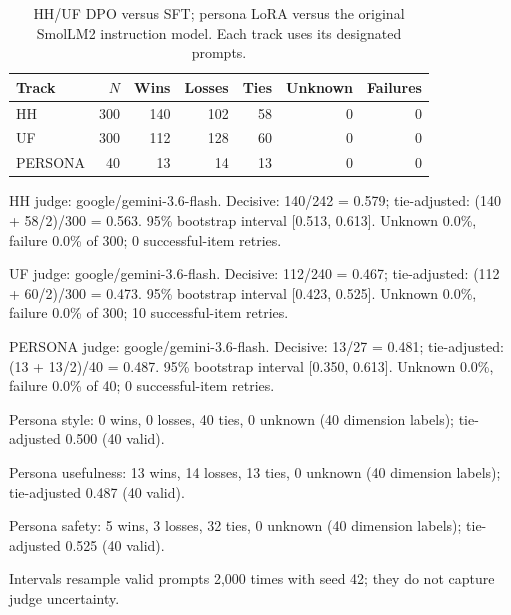 \begin{table}[H]\centering\small\begin{tabular}{lrrrrrr}\toprule Track & $N$ & Wins & Losses & Ties & Unknown & Failures\\\midrule
HH & 300 & 140 & 102 & 58 & 0 & 0\\
UF & 300 & 112 & 128 & 60 & 0 & 0\\
PERSONA & 40 & 13 & 14 & 13 & 0 & 0\\
\bottomrule\end{tabular}\caption{HH/UF DPO versus SFT; persona LoRA versus the original SmolLM2 instruction model. Each track uses its designated prompts.}\end{table}

HH judge: google/gemini-3.6-flash. Decisive: 140/242 = 0.579; tie-adjusted: (140 + 58/2)/300 = 0.563. 95\% bootstrap interval [0.513, 0.613]. Unknown 0.0\%, failure 0.0\% of 300; 0 successful-item retries.

UF judge: google/gemini-3.6-flash. Decisive: 112/240 = 0.467; tie-adjusted: (112 + 60/2)/300 = 0.473. 95\% bootstrap interval [0.423, 0.525]. Unknown 0.0\%, failure 0.0\% of 300; 10 successful-item retries.

PERSONA judge: google/gemini-3.6-flash. Decisive: 13/27 = 0.481; tie-adjusted: (13 + 13/2)/40 = 0.487. 95\% bootstrap interval [0.350, 0.613]. Unknown 0.0\%, failure 0.0\% of 40; 0 successful-item retries.

Persona style: 0 wins, 0 losses, 40 ties, 0 unknown (40 dimension labels); tie-adjusted 0.500 (40 valid).

Persona usefulness: 13 wins, 14 losses, 13 ties, 0 unknown (40 dimension labels); tie-adjusted 0.487 (40 valid).

Persona safety: 5 wins, 3 losses, 32 ties, 0 unknown (40 dimension labels); tie-adjusted 0.525 (40 valid).

Intervals resample valid prompts 2,000 times with seed 42; they do not capture judge uncertainty.
